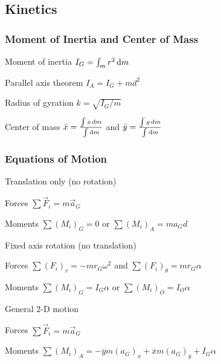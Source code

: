 \documentclass{article}
\begin{document}
\subsection{Kinetics}
\label{sec:rigid-body-planar-kinetics}

\subsubsection{Moment of Inertia and Center of Mass}

\begin{description*}
\item[Moment of inertia]
  \(I_G = \int_m r^2 \dif{m}\)
\item[Parallel axis theorem]
  \(I_A = I_G + md^2\)
\item[Radius of gyration]
  \(k = \sqrt{I_G/m}\)
\item[Center of mass]
  \(\bar{x} = \frac{\int x \dif{m}}{\int \dif{m}}\) and
  \(\bar{y} = \frac{\int y \dif{m}}{\int \dif{m}}\)
\end{description*}

\subsubsection{Equations of Motion}
\label{sec:rigid-body-equations-of-motion}

\begin{description*}
\item[Translation only (no rotation)]~
  \begin{description*}
  \item[Forces]
    \(\sum \vec{F}_i = m\vec{a}_G\)
  \item[Moments]
    \(\sum {(M_i)}_G = 0\) or \(\sum {(M_i)}_A = m a_G d\)
  \end{description*}
\item[Fixed axis rotation (no translation)]~
  \begin{description*}
  \item[Forces]
    \(\sum {(F_i)}_r = -m r_G \omega^2\) and
    \(\sum {(F_i)}_\theta = m r_G \alpha\)
  \item[Moments]
    \(\sum {(M_i)}_G = I_G \alpha\) or
    \(\sum {(M_i)}_O = I_O \alpha\)
  \end{description*}
\item[General 2-D motion]~
  \begin{description*}
  \item[Forces]
    \(\sum \vec{F}_i = m \vec{a}_G\)
  \item[Moments]
    \(\sum {(M_i)}_A = -\bar{y} m {(a_G)}_x + \bar{x} m {(a_G)}_y + I_G \alpha\)
  \end{description*}
\end{description*}
\end{document}
